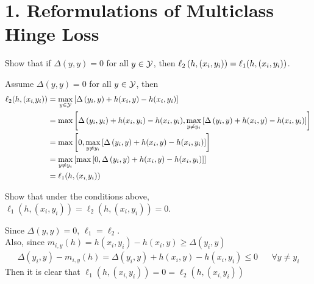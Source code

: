 \documentclass[12pt,letterpaper]{article}
\begin{document}
\newenvironment{solution}[2][Solution]{\begin{trivlist}
\item[\hskip \labelsep {\bfseries #1}]}{\end{trivlist}}
\newenvironment{problem}[2][Problem]{\begin{trivlist}
\item[\hskip \labelsep {\bfseries #1}\hskip \labelsep {\bfseries #2.}]}{\end{trivlist}}


\section*{1. Reformulations of Multiclass Hinge Loss}

\begin{problem}{1.2.1}
    Show that if $\Delta(y,y)=0$ for all $y\in\mathcal{Y}$, then $\ell_{2}\left(h,\left(x_{i},y_{i}\right)\right)=\text{\ensuremath{\ell}}_{1}(h,\left(x_{i},y_{i}\right))$.
\end{problem}
\begin{solution}{}
    Assume $\Delta(y,y)=0$ for all $y\in\mathcal{Y}$, then
    \begin{align*}
        \ell_{2}(h,(x_{i,}y_{i}))&=\max_{y\in\mathcal{Y}}\left[\Delta\left(y_{i},y\right)+h(x_{i},y)-h(x_{i},y_{i})\right]\\
        &= \max \left[\Delta\left(y_{i},y_{i}\right)+h(x_{i},y_{i})-h(x_{i},y_{i}), \max_{y\neq y_i}\left[\Delta\left(y_{i},y\right)+h(x_{i},y)-h(x_{i},y_{i})\right]\right]\\
        &= \max \left[ 0, \max_{y\neq y_i}\left[\Delta\left(y_{i},y\right)+h(x_{i},y)-h(x_{i},y_{i})\right]\right]\\
        &= \max_{y\neq y_i} \left[\max\left[0,\Delta\left(y_{i},y\right)+h(x_{i},y)-h(x_{i},y_{i})\right]\right]\\
        &=  \ell_{1}(h,(x_{i,}y_{i}))
    \end{align*}
\end{solution}
\newpage

\begin{problem}{1.2.2.a}
    Show that under the conditions above, $\ell_{1}(h,(x_{i},y_{i}))=\ell_{2}(h,(x_{i},y_{i}))=0$.
\end{problem}
\begin{solution}{}
    Since $\Delta(y,y)=0$, $\ell_1=\ell_2$.\\
    Also, since $m_{i,y}(h)=h(x_{i},y_{i})-h(x_{i},y)\ge\Delta(y_{i},y)$
    \begin{align*}
        \Delta(y_i, y) - m_{i,y}(h) = \Delta(y_i, y) + h(x_i, y) - h(x_i, y_i) \leq 0 && \forall y\neq y_{i}
    \end{align*}
    Then it is clear that $\ell_{1}(h,(x_{i,}y_{i})) = 0 = \ell_{2}(h,(x_{i,}y_{i}))$
\end{solution}
\newpage
\end{document}
